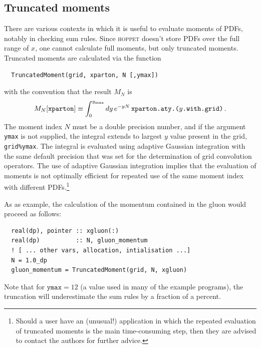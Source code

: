 \documentclass[12pt]{article}
\newcommand{\lc}{\left[}
\newcommand{\rc}{\right]}
\newcommand{\lp}{\left(}
\newcommand{\rp}{\right)}
\newcommand{\hoppet}{\textsc{hoppet}\xspace}
\newcommand{\ttt}[1]{\texttt{#1}}
\begin{document}
\subsection{Truncated moments}
\label{sec:sum-rules}

There are various contexts in which it is useful to evaluate moments
of PDFs, notably in checking sum rules. Since \hoppet doesn't store
PDFs over the full range of $x$, one cannot calculate full moments,
but only truncated moments.
%
%
Truncated moments are calculated via the function
\begin{lstlisting}
  TruncatedMoment(grid, xparton, N [,ymax])
\end{lstlisting}
with the convention that the result $M_N$ is 
\begin{equation}
  \label{eq:truncMom}
  M_N [\ttt{xparton}] \equiv \int_0^{y_{\rm max}} dy \,e^{-yN}\,
  \ttt{xparton.aty.(}y\ttt{.with.grid)}\,.
\end{equation}
The moment index $N$ must be a double precision number, and if the argument
\ttt{ymax} is not supplied, the integral extends to largest $y$ value
present in the grid, \ttt{grid\%ymax}. The integral is evaluated using
adaptive Gaussian integration with the same default precision that was
set for the determination of grid convolution operators. 
%
The use of adaptive Gaussian integration implies that the evaluation
of moments is not optimally efficient for repeated use of the same
moment index with different PDFs.\footnote{Should a user have an
  (unusual!) application in which the repeated evaluation of truncated
  moments is the main time-consuming step, then they are advised to
  contact the authors for further advice.}

As as example, the calculation of the momentum contained in the gluon
would proceed as follows:
\begin{lstlisting}
  real(dp), pointer :: xgluon(:)
  real(dp)          :: N, gluon_momentum
  ! [ ... other vars, allocation, intialisation ...]
  N = 1.0_dp
  gluon_momentum = TruncatedMoment(grid, N, xgluon)
\end{lstlisting}
Note that for $\ttt{ymax}= 12$ (a value used in many of the example
programs), the truncation will underestimate the sum rules by a
fraction of a percent.
\end{document}
